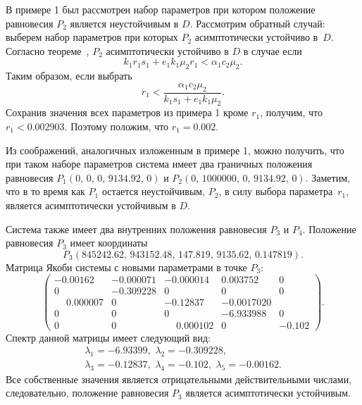 \documentclass[14pt,a4paper]{extarticle}
\begin{document}
	\begin{example}
		В примере 1 был рассмотрен набор параметров при котором положение равновесия $P_2$ является неустойчивым в $D$. Рассмотрим обратный случай: выберем набор параметров при которых $P_2$ асимптотически устойчиво в~$D$. Согласно теореме~, $P_2$ асимптотически устойчиво в $D$ в случае если
		\[k_1r_1s_1 + e_1k_1\mu_2r_1 < \alpha_1c_2\mu_2.\]
		Таким образом, если выбрать 
		\[r_1 < \dfrac{\alpha_1c_2\mu_2}{k_1s_1 + e_1k_1\mu_2}.\]
		Сохранив значения всех параметров из примера 1 кроме $r_1$, получим, что $r_1 < 0.002903$. Поэтому положим, что $r_1=0.002$.
		
		Из соображений, аналогичных изложенным в примере 1, можно получить, что при таком наборе параметров система имеет два граничных положения равновесия $P_1\left(0,\,0,\,0,\,9134.92,\,0\right)$ и $P_2\left(0,\,1000000,\,0,\,9134.92,\,0\right)$.
		Заметим, что в то время как $P_1$ остается неустойчивым, $P_2$, в силу выбора параметра~$r_1$, является асимптотически устойчивым в $D$.
		
		Система также имеет два внутренних положения равновесия $P_3$ и $P_4$. Положение равновесия $P_3$ имеет координаты
		\[P_3\left(845242.62,\, 943152.48,\, 147.819,\, 9135.62,\, 0.147819\right).\]
		Матрица Якоби системы с новыми параметрами в точке $P_3$: 
		\[\begin{pmatrix}
			-0.00162 & -0.000071& -0.000014&  0.003752&  0\\
			 0  &     -0.309228  & 0     &   0     &   0\\
			 \phantom{-}0.000007 & 0    &   -0.12837&  -0.001702  0\\
			 0&        0&        0     &  -6.933988&  0\\
			 0 &       0&        \phantom{-}0.000102 & 0 &       -0.102
		\end{pmatrix}.\]
		Спектр данной матрицы имеет следующий вид:
		\begin{multline*}
			\lambda_1=-6.93399,\,\, \lambda_2=-0.309228,\\
			\lambda_3=-0.12837,\,\, \lambda_4=-0.102,\,\, \lambda_5=-0.00162.
		\end{multline*}
		Все собственные значения является отрицательными действительными числами, следовательно, положение равновесия $P_3$ является асимптотически устойчивым.
		

\end{example}
\end{document}
